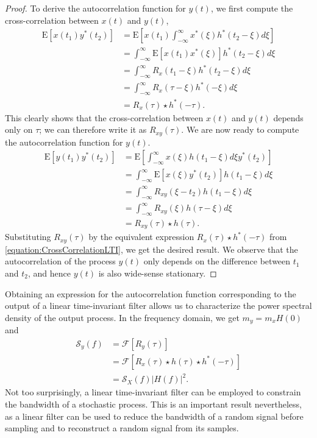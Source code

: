 \begin{proof}
To derive the autocorrelation function for $y(t)$, we first compute the cross-correlation between $x(t)$ and $y(t)$,
\begin{equation} \label{equation:CrossCorrelationLTI}
\begin{split}
\mathrm{E} [x(t_1) y^*(t_2) ]
&= \mathrm{E} \left[ x(t_1) \int_{-\infty}^{\infty} x^*(\xi) h^*(t_2 - \xi) d\xi \right] \\
&= \int_{-\infty}^{\infty} \mathrm{E} \left[ x(t_1) x^*(\xi) \right] h^*(t_2 - \xi) d\xi \\
&= \int_{-\infty}^{\infty} R_x(t_1 - \xi) h^*(t_2 - \xi) d\xi \\
&= \int_{-\infty}^{\infty} R_x(\tau - \xi) h^*(- \xi) d\xi \\
&= R_x(\tau) \star h^*(-\tau) .
\end{split}
\end{equation}
This clearly shows that the cross-correlation between $x(t)$ and $y(t)$ depends only on $\tau$; we can therefore write it as $R_{xy}(\tau)$.
We are now ready to compute the autocorrelation function for $y(t)$.
\begin{equation} \label{equation:AutoCorrelationLTI}
\begin{split}
\mathrm{E} [y(t_1) y^*(t_2) ]
&= \mathrm{E} \left[ \int_{-\infty}^{\infty} x(\xi) h(t_1 - \xi) d\xi y^*(t_2) \right] \\
&= \int_{-\infty}^{\infty} \mathrm{E} \left[ x(\xi) y^*(t_2) \right] h(t_1 - \xi) d\xi \\
&= \int_{-\infty}^{\infty} R_{xy}(\xi - t_2) h(t_1 - \xi) d\xi \\
&= \int_{-\infty}^{\infty} R_{xy}(\xi) h(\tau - \xi) d\xi \\
&= R_{xy}(\tau) \star h(\tau) .
\end{split}
\end{equation}
Substituting $R_{xy} (\tau)$ by the equivalent expression $R_x(\tau) \star h^*(-\tau)$ from \eqref{equation:CrossCorrelationLTI}, we get the desired result.
We observe that the autocorrelation of the process $y(t)$ only depends on the difference between $t_1$ and $t_2$, and hence $y(t)$ is also wide-sense stationary.
\end{proof}

Obtaining an expression for the autocorrelation function corresponding to the output of a linear time-invariant filter allows us to characterize the power spectral density of the output process.
In the frequency domain, we get $m_y = m_x H(0)$ and
\begin{equation*}
\begin{split}
\mathcal{S}_y (f) &= \mathcal{F} [ R_y (\tau) ] \\
&= \mathcal{F} \left[ R_x (\tau) \star h(\tau) \star h^*(-\tau) \right] \\
&= \mathcal{S}_X(f) |H(f)|^2 .
\end{split}
\end{equation*}
Not too surprisingly, a linear time-invariant filter can be employed to constrain the bandwidth of a stochastic process.
This is an important result nevertheless, as a linear filter can be used to reduce the bandwidth of a random signal before sampling and to reconstruct a random signal from its samples.


